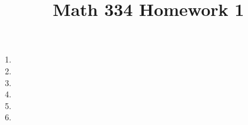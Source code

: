 \documentclass{article}
\title{Math 334 Homework 1}
\begin{document}
\maketitle
\begin{enumerate}
	\item 
	\item 
	\item 
	\item 
	\item 
	\item 
\end{enumerate}
\end{document}
